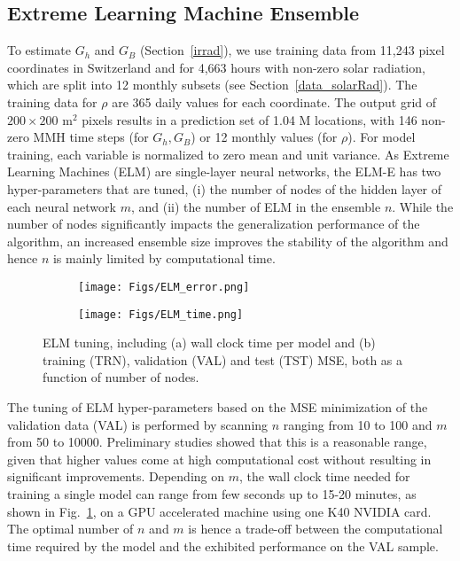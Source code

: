 \subsection*{Extreme Learning Machine Ensemble}
\label{app:tune_ELM}

To estimate $G_h$ and $G_B$ (Section~\ref{irrad}), we use training data from 11,243 pixel coordinates in Switzerland and for 4,663 hours with non-zero solar radiation, which are split into 12 monthly subsets (see Section~\ref{data_solarRad}).
The training data for $\rho$ are 365 daily values for each coordinate. 
The output grid of $200 \times 200$ m$^2$ pixels results in a prediction set of 1.04 M locations, with 146 non-zero MMH time steps (for $G_h, G_B$) or 12 monthly values (for $\rho$).  For model training, each variable is normalized to zero mean and unit variance.
%
As Extreme Learning Machines (ELM) are single-layer neural networks, the ELM-E has two hyper-parameters that are tuned, (i) the number of nodes of the hidden layer of each neural network $m$, and (ii) the number of ELM in the ensemble $n$. While the number of nodes significantly impacts the generalization performance of the algorithm, an increased ensemble size improves the stability of the algorithm and hence $n$ is mainly limited by computational time. %

\begin{figure}[tb]
\centering
\begin{subfigure}{.32\textwidth}
  \centering
  \texttt{[image: Figs/ELM\_error.png]}  
  \caption{}
  \label{figa:ELM_training}
\end{subfigure}
\begin{subfigure}{.32\textwidth}
  \centering
  \texttt{[image: Figs/ELM\_time.png]}  
  \caption{}
  \label{figb:ELM_training}
\end{subfigure}
\caption{ELM tuning, including (a) wall clock time per model and (b) training (TRN), validation (VAL) and test (TST) MSE, both as a function of number of nodes.}
\label{fig:ELM_training}
\end{figure}

The tuning of ELM hyper-parameters based on the MSE minimization of the validation data (VAL) is performed by scanning $n$ ranging from 10 to 100 and $m$ from 50 to 10000. Preliminary studies showed that this is a reasonable range, given that higher values come at high computational cost without resulting in significant improvements. Depending on $m$, the wall clock time needed for training a single model can range from few seconds up to 15-20 minutes, as shown in Fig.~\ref{figa:ELM_training}, on a GPU accelerated machine using one K40 NVIDIA card. The optimal number of $n$ and $m$ is hence a trade-off between the computational time required by the model and the exhibited performance on the VAL sample.

